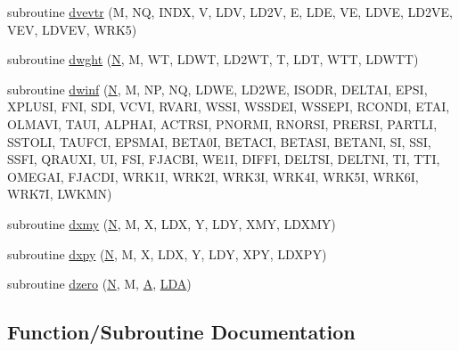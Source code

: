 \begin{DoxyCompactItemize}
\item 
subroutine \hyperlink{d__odr_8f_ab67717c02985d59f5828cffdf292325d}{dvevtr} (M, N\+Q, I\+N\+D\+X, V, L\+D\+V, L\+D2\+V, E, L\+D\+E, V\+E, L\+D\+V\+E, L\+D2\+V\+E, V\+E\+V, L\+D\+V\+E\+V, W\+R\+K5)
\item 
subroutine \hyperlink{d__odr_8f_ab90cfc38ce776f602d3e33f4a1b60f16}{dwght} (\hyperlink{polmisc_8c_a0240ac851181b84ac374872dc5434ee4}{N}, M, W\+T, L\+D\+W\+T, L\+D2\+W\+T, T, L\+D\+T, W\+T\+T, L\+D\+W\+T\+T)
\item 
subroutine \hyperlink{d__odr_8f_aa1bd22d0593d2d9eff21db53fe9a1016}{dwinf} (\hyperlink{polmisc_8c_a0240ac851181b84ac374872dc5434ee4}{N}, M, N\+P, N\+Q, L\+D\+W\+E, L\+D2\+W\+E, I\+S\+O\+D\+R, D\+E\+L\+T\+A\+I, E\+P\+S\+I, X\+P\+L\+U\+S\+I, F\+N\+I, S\+D\+I, V\+C\+V\+I, R\+V\+A\+R\+I, W\+S\+S\+I, W\+S\+S\+D\+E\+I, W\+S\+S\+E\+P\+I, R\+C\+O\+N\+D\+I, E\+T\+A\+I, O\+L\+M\+A\+V\+I, T\+A\+U\+I, A\+L\+P\+H\+A\+I, A\+C\+T\+R\+S\+I, P\+N\+O\+R\+M\+I, R\+N\+O\+R\+S\+I, P\+R\+E\+R\+S\+I, P\+A\+R\+T\+L\+I, S\+S\+T\+O\+L\+I, T\+A\+U\+F\+C\+I, E\+P\+S\+M\+A\+I, B\+E\+T\+A0\+I, B\+E\+T\+A\+C\+I, B\+E\+T\+A\+S\+I, B\+E\+T\+A\+N\+I, S\+I, S\+S\+I, S\+S\+F\+I, Q\+R\+A\+U\+X\+I, U\+I, F\+S\+I, F\+J\+A\+C\+B\+I, W\+E1\+I, D\+I\+F\+F\+I, D\+E\+L\+T\+S\+I, D\+E\+L\+T\+N\+I, T\+I, T\+T\+I, O\+M\+E\+G\+A\+I, F\+J\+A\+C\+D\+I, W\+R\+K1\+I, W\+R\+K2\+I, W\+R\+K3\+I, W\+R\+K4\+I, W\+R\+K5\+I, W\+R\+K6\+I, W\+R\+K7\+I, L\+W\+K\+M\+N)
\item 
subroutine \hyperlink{d__odr_8f_a2805b52b46e5833547432729f3bf70b2}{dxmy} (\hyperlink{polmisc_8c_a0240ac851181b84ac374872dc5434ee4}{N}, M, X, L\+D\+X, Y, L\+D\+Y, X\+M\+Y, L\+D\+X\+M\+Y)
\item 
subroutine \hyperlink{d__odr_8f_ae907cab252e5aa1ff0eb62a16792ec51}{dxpy} (\hyperlink{polmisc_8c_a0240ac851181b84ac374872dc5434ee4}{N}, M, X, L\+D\+X, Y, L\+D\+Y, X\+P\+Y, L\+D\+X\+P\+Y)
\item 
subroutine \hyperlink{d__odr_8f_ac41080db145208c850bceaa5f4e93a62}{dzero} (\hyperlink{polmisc_8c_a0240ac851181b84ac374872dc5434ee4}{N}, M, \hyperlink{classA}{A}, \hyperlink{example__user_8c_ae946da542ce0db94dced19b2ecefd1aa}{L\+D\+A})
\end{DoxyCompactItemize}


\subsection{Function/\+Subroutine Documentation}
\hypertarget{d__odr_8f_a9af23e7866b0bc36436747a3d4580edb}{}
